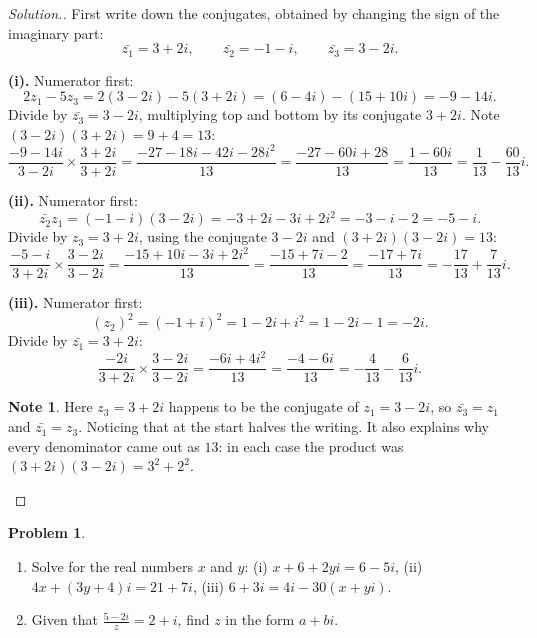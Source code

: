 \documentclass[11pt,a4paper]{article}
\theoremstyle{definition}
\newtheorem{note}[thm]{Note}
\newtheorem{problemx}{Problem}[section]
\newenvironment{problem}{\begin{problemx}}{\end{problemx}}
\newenvironment{solution}
  {\renewcommand{\qedsymbol}{}\begin{proof}[\textit{Solution}.]}
  {\end{proof}}
\begin{document}
\begin{solution}
First write down the conjugates, obtained by changing the sign of the imaginary part:
$$\bar{z_1}=3+2i,\qquad \bar{z_2}=-1-i,\qquad \bar{z_3}=3-2i.$$

\textbf{(i).} Numerator first:
$$2z_1-5z_3=2(3-2i)-5(3+2i)=(6-4i)-(15+10i)=-9-14i.$$
Divide by $\bar{z_3}=3-2i$, multiplying top and bottom by its conjugate $3+2i$. Note
$(3-2i)(3+2i)=9+4=13$:
$$\frac{-9-14i}{3-2i}\times\frac{3+2i}{3+2i}=\frac{-27-18i-42i-28i^2}{13}
=\frac{-27-60i+28}{13}=\frac{1-60i}{13}=\frac{1}{13}-\frac{60}{13}i.$$

\textbf{(ii).} Numerator first:
$$\bar{z_2}z_1=(-1-i)(3-2i)=-3+2i-3i+2i^2=-3-i-2=-5-i.$$
Divide by $z_3=3+2i$, using the conjugate $3-2i$ and $(3+2i)(3-2i)=13$:
$$\frac{-5-i}{3+2i}\times\frac{3-2i}{3-2i}=\frac{-15+10i-3i+2i^2}{13}
=\frac{-15+7i-2}{13}=\frac{-17+7i}{13}=-\frac{17}{13}+\frac{7}{13}i.$$

\textbf{(iii).} Numerator first:
$$\left(z_2\right)^2=(-1+i)^2=1-2i+i^2=1-2i-1=-2i.$$
Divide by $\bar{z_1}=3+2i$:
$$\frac{-2i}{3+2i}\times\frac{3-2i}{3-2i}=\frac{-6i+4i^2}{13}=\frac{-4-6i}{13}
=-\frac{4}{13}-\frac{6}{13}i.$$

\begin{note}
Here $z_3=3+2i$ happens to be the conjugate of $z_1=3-2i$, so $\bar{z_3}=z_1$ and
$\bar{z_1}=z_3$. Noticing that at the start halves the writing. It also explains why
every denominator came out as $13$: in each case the product was $(3+2i)(3-2i)=3^2+2^2$.
\end{note}
\end{solution}

\begin{problem}
\begin{enumerate}
\item[(a).] Solve for the real numbers $x$ and $y$:
\quad (i) $x+6+2yi=6-5i$, \quad (ii) $4x+(3y+4)i=21+7i$, \quad
(iii) $6+3i=4i-30(x+yi)$.
\item[(b).] Given that $\frac{5-2i}{z}=2+i$, find $z$ in the form $a+bi$.
\end{enumerate}
\end{problem}
\end{document}
